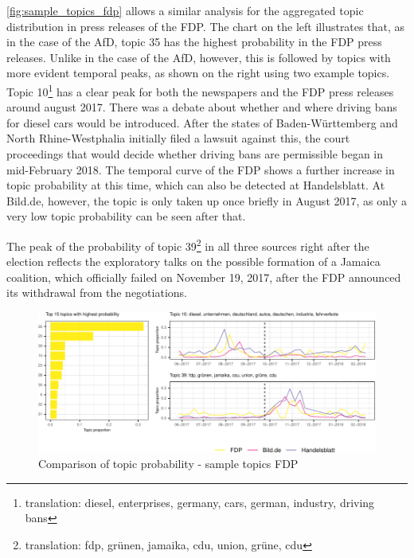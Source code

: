 \documentclass[
  12pt,
]{article}
\begin{document}
\autoref{fig:sample_topics_fdp} allows a similar analysis for the
aggregated topic distribution in press releases of the FDP. The chart on
the left illustrates that, as in the case of the AfD, topic 35 has the
highest probability in the FDP press releases. Unlike in the case of the
AfD, however, this is followed by topics with more evident temporal
peaks, as shown on the right using two example topics. Topic
10\footnote{translation: diesel, enterprises, germany, cars, german,
  industry, driving bans} has a clear peak for both the newspapers and
the FDP press releases around august 2017. There was a debate about
whether and where driving bans for diesel cars would be introduced.
After the states of Baden-Württemberg and North Rhine-Westphalia
initially filed a lawsuit against this, the court proceedings that would
decide whether driving bans are permissible began in mid-February 2018.
The temporal curve of the FDP shows a further increase in topic
probability at this time, which can also be detected at Handelsblatt. At
Bild.de, however, the topic is only taken up once briefly in August
2017, as only a very low topic probability can be seen after that.

The peak of the probability of topic 39\footnote{translation: fdp,
  grünen, jamaika, cdu, union, grüne, cdu} in all three sources right
after the election reflects the exploratory talks on the possible
formation of a Jamaica coalition, which officially failed on November
19, 2017, after the FDP announced its withdrawal from the negotiations.

\begin{figure}

{\centering \includegraphics[width=1\linewidth]{newspaper_files/figure-latex/Top FDP topics-1} 

}

\caption{Comparison of topic probability - sample topics FDP \label{fig:sample_topics_fdp}}\label{fig:Top FDP topics}
\end{figure}
\end{document}
